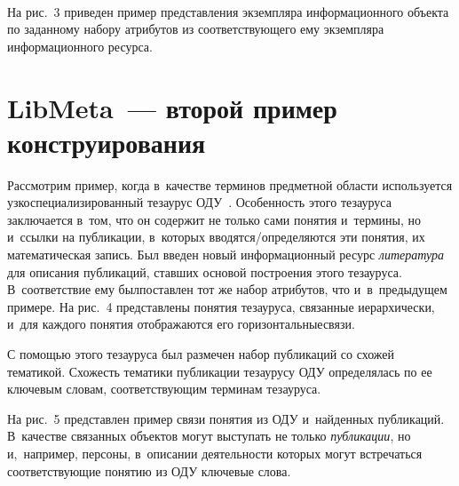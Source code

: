     \begin{figure*} %
      \vspace*{1pt}
\begin{center}
\mbox{%
\epsfxsize=160mm
}
\end{center}
\vspace*{-9pt}
\vspace*{12pt}
\end{figure*}

\begin{multicols}{2}

На рис.~3 приведен пример представления экземпляра 
информационного объекта по заданному набору атрибутов из 
соответствующего ему экземпляра информационного ресурса.

\section{LibMeta~--- второй пример конструирования}

    Рассмотрим пример, когда в~качестве терминов предметной области 
используется узкоспециализированный тезаурус ОДУ~\cite{8-ser}. Особенность этого 
тезауруса заключается в~том, что он содержит не только сами понятия 
и~термины, но и~ссылки на публикации, в~которых  
вво\-дят\-ся/опре\-де\-ля\-ют\-ся эти понятия, их математическая запись. Был 
введен новый информационный ресурс \textit{литература} для описания 
публикаций, ставших основой построения этого тезауруса. В~соответствие 
ему был\linebreak поставлен тот же набор атрибутов, что и~в~преды\-ду\-щем примере. 
На рис.~4 представлены понятия тезауруса, связанные иерархически, и~для 
каж\-дого понятия отображаются его горизонтальные\linebreak связи.
{ %

}


    С помощью этого тезауруса был размечен набор публикаций со схожей 
тематикой. Схожесть тематики публикации тезаурусу ОДУ определялась по 
ее ключевым словам, соответствующим терминам тезауруса. 

На рис.~5 
представлен пример связи понятия из ОДУ и~найденных публикаций. 
В~качестве связанных объектов могут выступать не только 
\textit{публикации}, но и,~например, персоны, в~описании деятельности 
которых могут встречаться соответствующие понятию из ОДУ ключевые 
слова.
    

\end{multicols}
